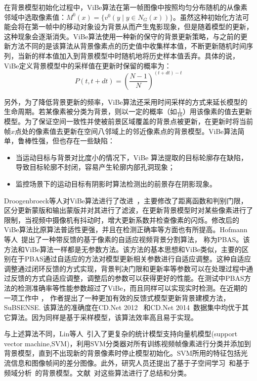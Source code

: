 在背景模型初始化过程中，ViBe算法在第一帧图像中按照均匀分布随机的从像素邻域中选取像素值：${M}^{0}(x)=\{v^{0}(y\mid y\in N_{G}(x))\}$。虽然这种初始化方法可能会将在第一帧中的移动对象设为背景从而产生鬼影现象，但是随着模型的更新，这种现象会逐渐消失。ViBe算法使用一种新的保守的背景更新策略，与之前的更新方法不同的是该算法从背景像素点的历史值中收集样本值，不断更新随机时间序列，当新的样本值加入到背景模型中时随机地将历史样本值丢弃。具体的说，ViBe定义背景模型中的采样值在更新时保留的概率为：
$$P(t,t+dt)={\left(\frac{N-1}{N} \right)}^{(t+dt)-t}$$ \par
另外，为了降低背景更新的频率，ViBe算法还采用时间采样的方式来延长模型的生命周期。若某像素被分类为背景，则以一定的概率（如$\frac{1}{16}$）用该像素的值去更新模型。为了保证空间一致性并使被前景区域覆盖的背景点被更新，在更新时将当前帧$x$点处的像素值去更新在空间八邻域上的邻近像素点的背景模型。ViBe算法简单，鲁棒性强，但也存在一些缺陷：
 \begin{itemize}
\item 当运动目标与背景对比度小的情况下，ViBe 算法提取的目标轮廓存在缺陷，导致目标轮廓不封闭，容易产生轮廓内部孔洞现象；
\item 监控场景下的运动目标有阴影时算法检测出的前景存在阴影现象。
\end{itemize}
\par
Droogenbroeck等人对ViBe算法进行了改进~\cite{vibe}，主要修改了距离函数和判别门限，区分更新蒙版和输出蒙版并对其进行了滤波，在更新背景模型时对某些像素进行了限制，当视频中摄像机有抖动时，增大更新系数并检查像素的闪烁。修改后的ViBe算法比原算法普适性更强，并且在检测正确率等方面也有所提高。Hofmann等人~\cite{pbas}提出了一种带反馈的基于像素的自适应视频背景分割算法， 称为PBAS。该方法和ViBe算法一样都是无参数方法。该方法的基本思想和ViBe类似，主要的区别在于PBAS通过自适应的方法对模型更新相关参数进行自适应调整。这种自适应调整通过闭环反馈的方式实现，背景判决门限和更新率等参数可以在处理过程中通过反馈的方式自适应调整，调整后的参数可以获得更好的性能。在测试中PBAS方法的检测准确率等性能参数超过了ViBe，而且同样可以实现实时检测。在近期的一项工作中 \cite{subsenseTIP}， 作者提出了一种更加有效的反馈式模型更新背景建模方法，SuBSENSE. 该算法的准确度在CD.Net 2012~\cite{CDNet2012} 和CD.Net 2014~\cite{CD2014}数据集中均优于其它算法。因为同样是基于采样模型，该算法效率高且易于实现。\par
与上述算法不同，Lin等人~\cite{lin2002a}引入了更复杂的统计模型支持向量机模型(support vector machine,SVM)，利用SVM分类器对所有训练视频帧像素进行分类并添加到背景模型，直到不出现新的背景像素时停止模型初始化。SVM所用的特征包括光流信息和图像帧间的差分图像。此外，研究人员还提出了基于子空间学习~\cite{uray2007incremental}和基于频域分析~\cite{Gao2009}的背景模型。文献~对这些算法进行了总结和分类。

